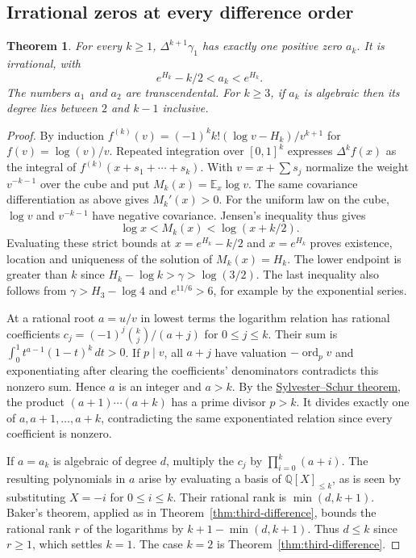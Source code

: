 \documentclass[11pt,a4paper]{article}
\newtheorem{theorem}{Theorem}[section]
\theoremstyle{definition}\newtheorem{definition}[theorem]{Definition}\newtheorem{example}[theorem]{Example}
\theoremstyle{remark}\newtheorem{remark}[theorem]{Remark}
\newcommand{\Q}{\mathbb Q}\newcommand{\Z}{\mathbb Z}\newcommand{\R}{\mathbb R}\newcommand{\N}{\mathbb N}
\begin{document}
\subsection{Irrational zeros at every difference order}\label{sec:all-finite-difference}
\begin{theorem}\label{thm:all-finite-difference}
For every $k\ge1$, $\Delta^{k+1}\gamma_1$ has exactly one positive zero $a_k$. It is irrational, with
\[
 e^{H_k}-k/2<a_k<e^{H_k}.
\]
The numbers $a_1$ and $a_2$ are transcendental. For $k\ge3$, if $a_k$ is algebraic then its degree lies between $2$ and $k-1$ inclusive.
\end{theorem}
\begin{proof}
By induction $f^{(k)}(v)=(-1)^k k!(\log v-H_k)/v^{k+1}$ for $f(v)=\log(v)/v$. Repeated integration over $[0,1]^k$ expresses $\Delta^k f(x)$ as the integral of $f^{(k)}(x+s_1+\cdots+s_k)$. With $v=x+\sum s_j$ normalize the weight $v^{-k-1}$ over the cube and put $M_k(x)=\mathbb E_x\log v$. The same covariance differentiation as above gives $M_k'(x)>0$. For the uniform law on the cube, $\log v$ and $v^{-k-1}$ have negative covariance. Jensen's inequality thus gives
\[
 \log x<M_k(x)<\log(x+k/2).
\]
Evaluating these strict bounds at $x=e^{H_k}-k/2$ and $x=e^{H_k}$ proves existence, location and uniqueness of the solution of $M_k(x)=H_k$. The lower endpoint is greater than $k$ since $H_k-\log k>\gamma>\log(3/2)$. The last inequality also follows from $\gamma>H_3-\log4$ and $e^{11/6}>6$, for example by the exponential series.

At a rational root $a=u/v$ in lowest terms the logarithm relation has rational coefficients $c_j=(-1)^j\binom{k}{j}/(a+j)$ for $0\le j\le k$. Their sum is $\int_0^1 t^{a-1}(1-t)^k\,dt>0$. If $p\mid v$, all $a+j$ have valuation $-\operatorname{ord}_p v$ and exponentiating after clearing the coefficients' denominators contradicts this nonzero sum. Hence $a$ is an integer and $a>k$. By the \href{https://doi.org/10.1112/jlms/s1-9.4.282}{Sylvester--Schur theorem}, the product $(a+1)\cdots(a+k)$ has a prime divisor $p>k$. It divides exactly one of $a,a+1,\ldots,a+k$, contradicting the same exponentiated relation since every coefficient is nonzero.

If $a=a_k$ is algebraic of degree $d$, multiply the $c_j$ by $\prod_{i=0}^k(a+i)$. The resulting polynomials in $a$ arise by evaluating a basis of $\Q[X]_{\le k}$, as is seen by substituting $X=-i$ for $0\le i\le k$. Their rational rank is $\min(d,k+1)$. Baker's theorem, applied as in Theorem~\ref{thm:third-difference}, bounds the rational rank $r$ of the logarithms by $k+1-\min(d,k+1)$. Thus $d\le k$ since $r\ge1$, which settles $k=1$. The case $k=2$ is Theorem~\ref{thm:third-difference}.


\end{proof}
\end{document}
